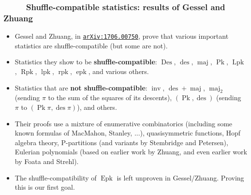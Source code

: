 \documentclass{beamer}
\newcommand{\red}{\color{red}}
\newcommand{\Lpk}{\operatorname{Lpk}}
\newcommand{\lpk}{\operatorname{lpk}}
\newcommand{\Rpk}{\operatorname{Rpk}}
\newcommand{\rpk}{\operatorname{rpk}}
\newcommand{\Pk}{\operatorname{Pk}}
\newcommand{\Epk}{\operatorname{Epk}}
\newcommand{\epk}{\operatorname{epk}}
\newcommand{\Des}{\operatorname{Des}}
\newcommand{\des}{\operatorname{des}}
\newcommand{\maj}{\operatorname{maj}}
\newcommand\arxiv[1]{\href{http://www.arxiv.org/abs/#1}{\texttt{arXiv:#1}}}
\newcommand{\fti}[1]{\frametitle{\ \ \ \ \ #1}}
\newcommand{\tup}[1]{\left( #1 \right)}
\theoremstyle{plain}
\begin{document}
\begin{frame}
\fti{Shuffle-compatible statistics: results of Gessel and Zhuang}

\begin{itemize}

\item Gessel and Zhuang, in {\red \arxiv{1706.00750}}, prove that
      various important statistics are shuffle-compatible (but some
      are not).

\pause

\item Statistics they show to be \textbf{shuffle-compatible}: $\Des$, $\des$,
      $\maj$, $\Pk$, $\Lpk$, $\Rpk$, $\lpk$, $\rpk$, $\epk$,
      and various others.

\pause

\item Statistics that are \textbf{not shuffle-compatible}:
      $\operatorname{inv}$, $\des + \maj$, $\maj_2$ (sending $\pi$
      to the sum of the squares of its descents),
      $\tup{\Pk, \des}$ (sending $\pi$ to $\tup{\Pk\pi, \des\pi}$),
      and others.

\pause 

\item Their proofs use a mixture of enumerative combinatorics
      (including some known formulas of MacMahon, Stanley, ...),
      quasisymmetric functions, Hopf algebra theory,
      P-partitions (and variants by Stembridge and Petersen),
      Eulerian polynomials (based on earlier work by Zhuang,
      and even earlier work by Foata and Strehl).

\pause

\item The shuffle-compatibility of $\Epk$ is left unproven
      in Gessel/Zhuang. Proving this is our first goal.

\end{itemize}

\end{frame}
\end{document}
